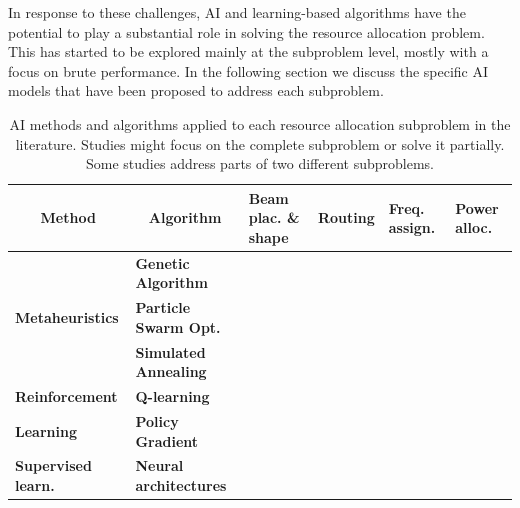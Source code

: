 \documentclass[letterpaper]{article} %
\begin{document}
In response to these challenges, AI and learning-based algorithms have the potential to play a substantial role in solving the resource allocation problem. This has started to be explored mainly at the subproblem level, mostly with a focus on brute performance. In the following section we discuss the specific AI models that have been proposed to address each subproblem.


\begin{table}
\begin{center}
\begin{tabular}{|l|l|m{3cm}|m{2cm}|m{2cm}|m{2cm}|}
\hline
\multicolumn{1}{|c|}{\textbf{Method}} & \multicolumn{1}{c|}{\textbf{Algorithm}} & \textbf{Beam plac. \& shape}  & \textbf{Routing}   & \textbf{Freq. assign.}   & \textbf{Power alloc.}   \\ \hline
  & \textbf{Genetic Algorithm}    & \citeyear{wangdynamic, Deng2018, He2017, Anzalchi2010, Angeletti2006} &  \citeyear{rao2011performance}  & \citeyear{He2017, tirmizi2015efficient, Angeletti2006, Paris2019} & \citeyear{Aravanis2015, Anzalchi2010, Paris2019} \\ \cline{2-6}
\textbf{Metaheuristics}  & \textbf{Particle Swarm Opt.}   &   &     & \citeyear{pachler20b}  & \citeyear{Durand2017, pachler20b} \\ \cline{2-6}
 & \textbf{Simulated Annealing} & \citeyear{Camino2014} &  & \citeyear{vidal2020joint, Cocco2018, Camino2014} & \citeyear{vidal2020joint, Cocco2018}   \\ \hline
\textbf{Reinforcement} & \textbf{Q-learning}  &  \citeyear{hu2020dynamic}  &  \citeyear{gong2020adaptive}  & \citeyear{liao2020distributed, zheng2020leo, Ferreira2018, Hu2018ASystems}   & \citeyear{zhang2020online, liao2020distributed, Ferreira2018}  \\ \cline{2-6}
\textbf{Learning}   & \textbf{Policy Gradient}  &   &    &    & \citeyear{Luis2019, Luis2020} \\ \hline
\textbf{Supervised learn.}  & \textbf{Neural architectures}  &  &  & \citeyear{Funabiki1997, Salcedo-Sanz2005}  & \\ \hline
\end{tabular}
\end{center}
\caption{AI methods and algorithms applied to each resource allocation subproblem in the literature. Studies might focus on the complete subproblem or solve it partially. Some studies address parts of two different subproblems.}
\label{tab:literature}
\end{table}
\end{document}
